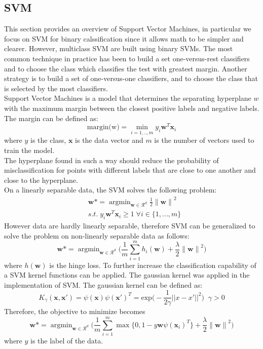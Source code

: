 \documentclass{article}
\DeclareMathOperator*{\argmin}{argmin}
\begin{document}
\subsection{SVM}
This section provides an overview of Support Vector Machines, in particular we focus on SVM for binary calssification since it allows math to be simpler and clearer. However, multiclass SVM are built using binary SVMs. The most common technique in practice has been to build  a set one-versus-rest classifiers and to choose the class which classifies the test with greatest margin. Another strategy is to build a set of one-versus-one classifiers, and to choose the class that is selected by the most classifiers. \cite{svm}
\\
Support Vector Machines is a model that determines the separating hyperplane $w$ with the maximum margin between the closest positive labels and negative labels. The margin can be defined as:
\begin{equation}
\text{margin(w)} = \min_{i=1,..,m} y_i\textbf{w}^T\textbf{x}_i
\end{equation}
where $y$ is the class, $\textbf{x}$ is the data vector and $m$ is the number of vectors used to train the model. \\
The hyperplane found in such a way should reduce the probability of misclassification for points with different labels that are close to one another and close to the hyperplane. \\
On a linearly separable data, the SVM solves the following problem:
\begin{equation}
\begin{split}
   &   \textbf{w} \mbox{*} = \argmin_{\textbf{w} \in \mathcal{R}^d} \frac{1}{2} {\lVert \textbf{w} \rVert}^2 \\
   & s.t.\; y_i\textbf{w}^{T}\textbf{x}_i \geq 1 \; \forall i \in \{1, ...,m\} 
\end{split}
\end{equation}
However data are hardly linearly separable, therefore SVM can be generalized to solve the problem on non-linearly separable data as follows:
\begin{equation}
      \textbf{w} \mbox{*} = \argmin_{\textbf{w} \in \mathcal{R}^d} \bigg( \frac{1}{m}\sum_{i=1}^m h_i(\textbf{w}) + \frac{\lambda}{2} {\lVert \textbf{w} \rVert}^2 \bigg)
\end{equation}
where $h(\textbf{w})$ is the hinge loss.
To further increase the classification capability of a SVM kernel functions can be applied. The gaussian kernel was applied in the implementation of SVM.
The gaussian kernel can be defined as:
\begin{equation}
K_{\gamma}(\textbf{x},\textbf{x}') = \psi(\textbf{x}) \psi(\textbf{x}')^T  = \text{exp} \bigg( - \frac{1}{2 \gamma} ||x - x' ||^2 \bigg) \;\; \gamma > 0
\end{equation}
Therefore, the objective to minimize becomes
\begin{equation}
      \textbf{w} \mbox{*} = \argmin_{\textbf{w} \in \mathcal{R}^d} \bigg( \frac{1}{m}\sum_{i=1}^m \max\{0,1-y\textbf{w} \psi(\textbf{x}_i)^T\} + \frac{\lambda}{2} {\lVert \textbf{w} \rVert}^2 \bigg)
\end{equation}
where $y$ is the label of the data. \cite{book1} \cite{book2}
\end{document}
